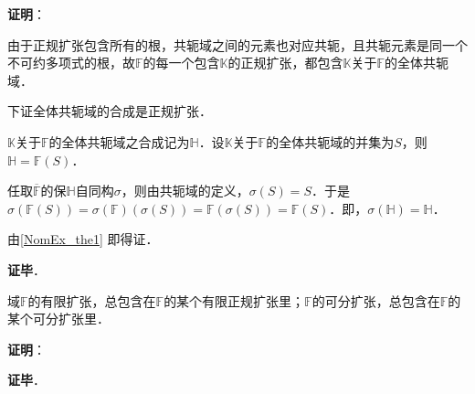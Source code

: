 \textbf{证明}：

由于正规扩张包含所有的根，共轭域之间的元素也对应共轭，且共轭元素是同一个不可约多项式的根，故$\mathbb{F}$的每一个包含$\mathbb{K}$的正规扩张，都包含$\mathbb{K}$关于$\mathbb{F}$的全体共轭域．

下证全体共轭域的合成是正规扩张．

$\mathbb{K}$关于$\mathbb{F}$的全体共轭域之合成记为$\mathbb{H}$．设$\mathbb{K}$关于$\mathbb{F}$的全体共轭域的并集为$S$，则$\mathbb{H}=\mathbb{F}(S)$．

任取$\overline{\mathbb{F}}$的保$\mathbb{H}$自同构$\sigma$，则由共轭域的定义，$\sigma(S)=S$．于是$\sigma(\mathbb{F}(S))=\sigma(\mathbb{F})(\sigma(S))=\mathbb{F}(\sigma(S))=\mathbb{F}(S)$．即，$\sigma(\mathbb{H})=\mathbb{H}$．

由\autoref{NomEx_the1} 即得证．

\textbf{证毕}．


\begin{theorem}{}
域$\mathbb{F}$的有限扩张，总包含在$\mathbb{F}$的某个有限正规扩张里；$\mathbb{F}$的可分扩张，总包含在$\mathbb{F}$的某个可分扩张里．
\end{theorem}

\textbf{证明}：



\textbf{证毕}．













